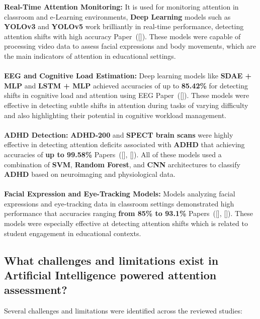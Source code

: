 \documentclass[12pt]{article}
\begin{document}
\textbullet \textbf{Real-Time Attention Monitoring:} It is used for monitoring attention in classroom and e-Learning environments, \textbf{Deep Learning} models such as \textbf{YOLOv3} and \textbf{YOLOv5} work brilliantly in real-time performance, detecting attention shifts with high accuracy Paper~([\citealp{ref8}]). These models were capable of processing video data to assess facial expressions and body movements, which are the main indicators of attention in educational settings. \\ \\ 
\textbullet \textbf{EEG and Cognitive Load Estimation:} Deep learning models like \textbf{SDAE + MLP} and \textbf{LSTM + MLP} achieved accuracies of up to \textbf{85.42\%} for detecting shifts in cognitive load and attention using EEG Paper~([\citealp{ref3}]). These models were effective in detecting subtle shifts in attention during tasks of varying difficulty and also highlighting their potential in cognitive workload management.  \\ \\
\textbullet \textbf{ADHD Detection:} \textbf{ADHD-200} and \textbf{SPECT brain scans} were highly effective in detecting attention deficits associated with \textbf{ADHD} that achieving accuracies of \textbf{up to 99.58\%} Papers~([\citealp{ref11}], [\citealp{ref19}]). All of these models used a combination of \textbf{SVM}, \textbf{Random Forest}, and \textbf{CNN} architectures to classify \textbf{ADHD} based on neuroimaging and physiological data.  \\ \\
\textbullet \textbf{Facial Expression and Eye-Tracking Models:} Models analyzing facial expressions and eye-tracking data in classroom settings demonstrated high performance that accuracies ranging \textbf{from 85\% to 93.1\%} Papers~([\citealp{ref7}], [\citealp{ref8}]). These models were especially effective at detecting attention shifts which is related to student engagement in educational contexts.  \\ 

\subsection{ What challenges and limitations exist in Artificial Intelligence powered attention assessment?}
Several challenges and limitations were identified across the reviewed studies: \\
\end{document}
